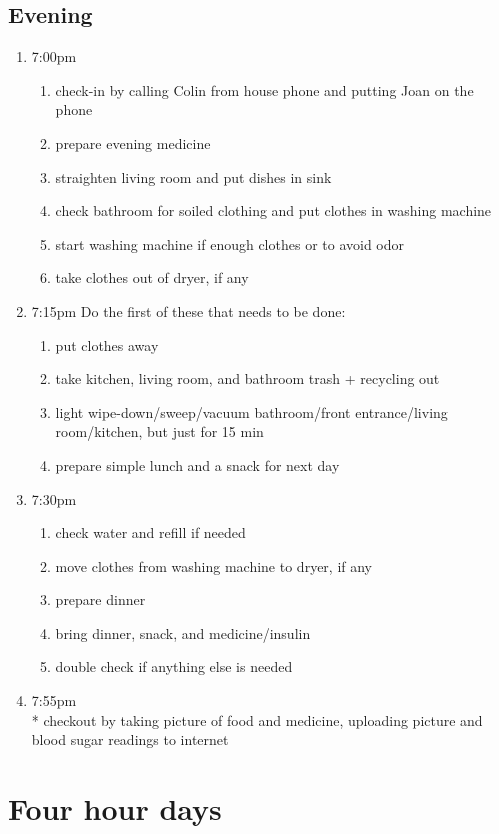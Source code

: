 \documentclass[12pt,letterpaper]{article}
\begin{document}
\begin{multicols}{2}
	\subsection*{Evening}
	\begin{enumerate}
		\item 7:00pm
			\begin{enumerate}
				\item check-in by calling Colin from house phone and putting Joan on the phone
				\item prepare evening medicine
				\item straighten living room and put dishes in sink
				\item check bathroom for soiled clothing and put clothes in washing machine
				\item start washing machine if enough clothes or to avoid odor
				\item take clothes out of dryer, if any
			\end{enumerate}
		\item 7:15pm
			Do the first of these that needs to be done:
			\begin{enumerate}
				\item put clothes away
				\item take kitchen, living room, and bathroom trash + recycling out
				\item light wipe-down/sweep/vacuum bathroom/front entrance/living room/kitchen, but just for 15 min
				\item prepare simple lunch and a snack for next day
			\end{enumerate}
		\item 7:30pm
			\begin{enumerate}
				\item check water and refill if needed
				\item move clothes from washing machine to dryer, if any
				\item prepare dinner
				\item bring dinner, snack, and medicine/insulin
				\item double check if anything else is needed
			\end{enumerate}
		\item 7:55pm \\*
			checkout by taking picture of food and medicine, uploading picture and blood sugar readings to internet
	\end{enumerate}

	\section*{Four hour days}

\end{multicols}
\end{document}
